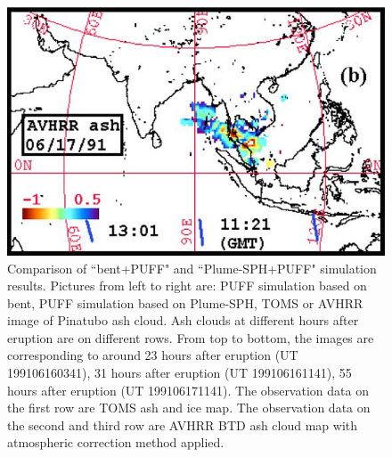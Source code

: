 \begin{figure}[!htb]
\begin{minipage}{.325 \textwidth}
    \end{minipage}%
    \begin{minipage}{.325 \textwidth}
        \centering
        \includegraphics[width=0.99 \textwidth]{Chapter-7/Figures/OB-ash-55hr-ash}
    \end{minipage}%
    \caption{Comparison of ``bent+PUFF" and ``Plume-SPH+PUFF" simulation results. Pictures from left to right are: PUFF simulation based on bent, PUFF simulation based on Plume-SPH, TOMS or AVHRR image of Pinatubo ash cloud. Ash clouds at different hours after eruption are on different rows. From top to bottom, the images are corresponding to around 23 hours after eruption (UT 199106160341), 31 hours after eruption (UT 199106161141), 55 hours after eruption (UT 199106171141). The observation data on the first row are TOMS ash and ice map. The observation data on the second and third row are AVHRR BTD ash cloud map with atmospheric correction method applied.}
    \label{fig:Plume-SPH-PUFF-ash-cloud}
\end{figure}

